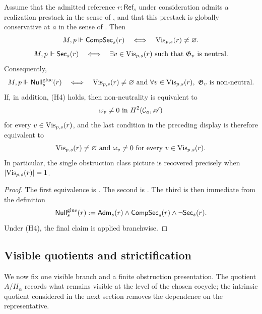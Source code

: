 \begin{theorem}\label{thm:gerbe-null-semantics}
Assume that the admitted reference $r:\mathsf{Ref}_s$ under consideration admits a realization prestack in the sense of , and that this prestack is globally conservative at $a$ in the sense of . Then
\[
M,p\Vdash \mathsf{CompSec}_s(r)
\quad\Longleftrightarrow\quad
\mathrm{Vis}_{p,s}(r)\neq\varnothing.
\]
\[
M,p\Vdash \mathsf{Sec}_s(r)
\quad\Longleftrightarrow\quad
\exists v\in \mathrm{Vis}_{p,s}(r)\ \text{such that}\ \mathfrak G_v\ \text{is neutral}.
\]
Consequently,
\[
M,p\Vdash \mathsf{Null}^{\mathrm{glue}}_s(r)
\quad\Longleftrightarrow\quad
\mathrm{Vis}_{p,s}(r)\neq\varnothing
\ \text{and}\
\forall v\in \mathrm{Vis}_{p,s}(r),\ \mathfrak G_v\ \text{is non-neutral}.
\]
If, in addition, \textup{(H4)} holds, then non-neutrality is equivalent to
\[
\omega_v\neq 0\ \text{in}\ H^2(\mathcal C_a,\mathscr{A})
\]
for every $v\in \mathrm{Vis}_{p,s}(r)$, and the last condition in the preceding display is therefore equivalent to
\[
\mathrm{Vis}_{p,s}(r)\neq\varnothing
\ \text{and}\
\omega_v\neq 0\ \text{for every}\ v\in \mathrm{Vis}_{p,s}(r).
\]
In particular, the single obstruction class picture is recovered precisely when $|\mathrm{Vis}_{p,s}(r)|=1$.
\end{theorem}

\begin{proof}
The first equivalence is . The second is . The third is then immediate from the definition
\[
\mathsf{Null}^{\mathrm{glue}}_s(r):=\mathsf{Adm}_s(r)\land \mathsf{CompSec}_s(r)\land \neg\mathsf{Sec}_s(r).
\]
Under \textup{(H4)}, the final claim is  applied branchwise.
\end{proof}

\subsection{Visible quotients and strictification}

We now fix one visible branch and a finite obstruction presentation. The quotient $A/H_\alpha$ records what remains visible at the level of the chosen cocycle; the intrinsic quotient considered in the next section removes the dependence on the representative.

